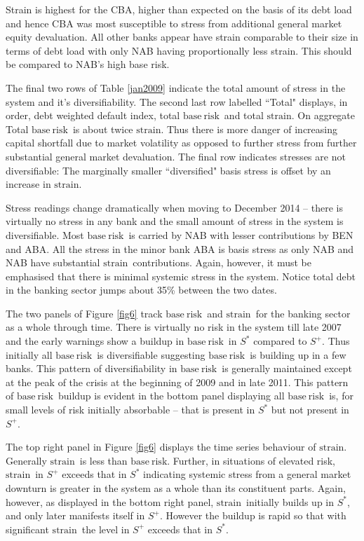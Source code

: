 \documentclass[authoryear]{elsarticle}
\newcommand{\br}{\ensuremath{\mathrm{base\ risk}}}
\newcommand{\pr}{\ensuremath{\mathrm{strain}}}
\newcommand{\fref}[1]{Figure \ref{#1}}
\newcommand{\tref}[1]{Table \ref{#1}}
\begin{document}
Strain  is highest for the CBA, higher than expected on the basis of its debt load and hence CBA was most susceptible to stress from additional general market equity devaluation.    All other banks appear have strain comparable to their size in terms of debt load with only NAB having proportionally less strain.    This should be compared to NAB's high base risk.

The final two rows of \tref{jan2009} indicate the total amount of stress in the system and it's diversifiability.    
The second last  row labelled ``Total"  displays, in order, debt weighted default index, total \br\  and total \pr.  On aggregate Total \br\  is about twice \pr.   Thus there is more danger of increasing capital shortfall due to market volatility  as opposed to further stress from further substantial general market devaluation.  The final row indicates stresses are not diversifiable:    The marginally  smaller  ``diversified"  basis stress is offset by an increase in \pr.   

Stress readings  change dramatically when moving to December 2014 -- there is virtually no stress in any bank and the small amount of  stress in the system is diversifiable.    Most  \br\ is carried by NAB with lesser contributions by BEN and ABA.    All the stress in the minor bank ABA is basis stress as only NAB and NAB have substantial \pr\  contributions.   Again, however, it must be emphasised that there is minimal systemic stress in the system.  Notice total debt in the banking sector  jumps about 35\% between the two dates.

The two  panels of \fref{fig6} track  \br\ and \pr\ for the banking sector as a whole through time.   There is virtually no risk in the system till late 2007 and the early warnings show a buildup in \br\ in $S^*$ compared to $S^+$.   Thus initially all \br\ is diversifiable suggesting \br\ is building up in a few banks.   This pattern of diversifiability in \br\ is generally maintained except at the peak of the crisis at the beginning of 2009 and in late 2011.  This pattern of \br\ buildup is evident in the bottom panel displaying all \br\ is, for small levels of risk initially absorbable -- that is present in $S^*$ but not present in $S^+$. 

The top right panel in \fref{fig6} displays the time series behaviour of \pr.  Generally \pr\ is less than \br.   Further, in situations of elevated risk,  \pr\ in $S^+$ exceeds that in $S^*$ indicating systemic stress from a general market downturn is greater in the system as a whole than its constituent parts.   Again, however, as displayed in the bottom right panel, \pr\ initially builds up in $S^*$, and only later manifests itself in $S^+$.  However the buildup is rapid so that with significant \pr\ the level in $S^+$ exceeds that in $S^*$.
\end{document}
